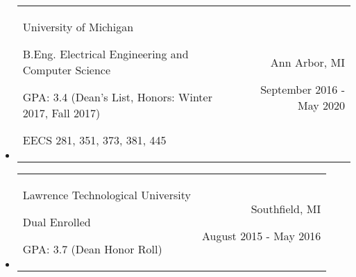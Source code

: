\documentclass[9pt]{memoir}
\begin{document}
\begin{itemize}

\item

\begin{tabular}[t]{lr}

\begin{minipage}[t]{0.6 \textwidth}
\raggedright

\normalsize
University of Michigan

\small

B.Eng. Electrical Engineering and Computer Science

GPA: 3.4 (Dean's List, Honors: Winter 2017, Fall 2017)

EECS 281, 351, 373, 381, 445
\end{minipage}

&

\begin{minipage}[t]{0.3 \textwidth}
\raggedleft

\normalsize
Ann Arbor, MI

\small
September 2016 - May 2020
\end{minipage}

\\

\end{tabular}

\item

\begin{tabular}[t]{lr}

\begin{minipage}[t]{0.6 \textwidth}
\raggedright

\normalsize
Lawrence Technological University

\small

Dual Enrolled

GPA: 3.7 (Dean Honor Roll)
\end{minipage}

&

\begin{minipage}[t]{0.3 \textwidth}
\raggedleft

\normalsize
Southfield, MI

\small
August 2015 - May 2016
\end{minipage}

\\

\end{tabular}

\end{itemize}
\end{document}
